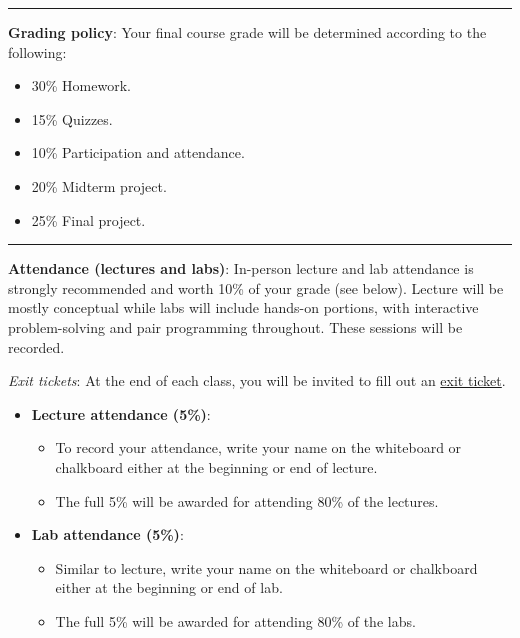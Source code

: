 \documentclass[12pt]{article}
\begin{document}
\begin{center}
  \rule{\textwidth}{0.5pt}
\end{center}

\noindent\textbf{Grading policy}: Your final course grade will be determined according to the following:
\begin{itemize}
  \itemsep-0.3em
  \item 30\% Homework.
  \item 15\% Quizzes.
  \item 10\% Participation and attendance.
  \item 20\% Midterm project.
  \item 25\% Final project.
\end{itemize}

\begin{center}
  \rule{\textwidth}{0.5pt}
\end{center}

\noindent\textbf{Attendance (lectures and labs)}: In-person lecture and lab attendance is strongly recommended and worth 10\% of your grade (see below).
Lecture will be mostly conceptual while labs will include hands-on portions, with interactive problem-solving and pair programming throughout.
These sessions will be recorded.

\emph{Exit tickets}: At the end of each class, you will be invited to fill out an \href{https://forms.gle/opY7EFZJiRBgkMsAA}{exit ticket}.

\begin{itemize}
  \itemsep-0.3em
  \item \textbf{Lecture attendance (5\%)}:
        \begin{itemize}
          \itemsep-0.3em
          \item To record your attendance, write your name on the whiteboard or chalkboard either at the beginning or end of lecture.
          \item The full 5\% will be awarded for attending 80\% of the lectures.
        \end{itemize}
  \item \textbf{Lab attendance (5\%)}:
        \begin{itemize}
          \itemsep-0.3em
          \item Similar to lecture, write your name on the whiteboard or chalkboard either at the beginning or end of lab.
          \item The full 5\% will be awarded for attending 80\% of the labs.
        \end{itemize}
\end{itemize}
\end{document}
